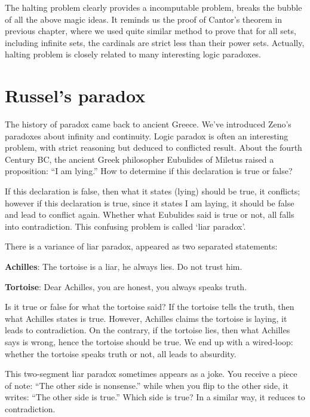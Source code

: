 \documentclass{article}
\begin{document}
The halting problem clearly provides a incomputable problem, breaks the bubble of all the above magic ideas. It reminds us the proof of Cantor's theorem in previous chapter, where we used quite similar method to prove that for all sets, including infinite sets, the cardinals are strict less than their power sets. Actually, halting problem is closely related to many interesting logic paradoxes.

\section{Russel's paradox}

The history of paradox came back to ancient Greece. We've introduced Zeno's paradoxes about infinity and continuity. Logic paradox is often an interesting problem, with strict reasoning but deduced to conflicted result. About the fourth Century BC, the ancient Greek philosopher Eubulides of Miletus raised a proposition: ``I am lying.'' How to determine if this declaration is true or false?

If this declaration is false, then what it states (lying) should be true, it conflicts; however if this declaration is true, since it states I am laying, it should be false and lead to conflict again. Whether what Eubulides said is true or not, all falls into contradiction. This confusing problem is called `liar paradox'.

There is a variance of liar paradox, appeared as two separated statements:

\textbf{Achilles}: The tortoise is a liar, he always lies. Do not trust him.

\textbf{Tortoise}: Dear Achilles, you are honest, you always speaks truth.

Is it true or false for what the tortoise said? If the tortoise tells the truth, then what Achilles states is true. However, Achilles claims the tortoise is laying, it leads to contradiction. On the contrary, if the tortoise lies, then what Achilles says is wrong, hence the tortoise should be true. We end up with a wired-loop: whether the tortoise speaks truth or not, all leads to absurdity.

This two-segment liar paradox sometimes appears as a joke. You receive a piece of note: ``The other side is nonsense.'' while when you flip to the other side, it writes: ``The other side is true.'' Which side is true? In a similar way, it reduces to contradiction.
\end{document}
